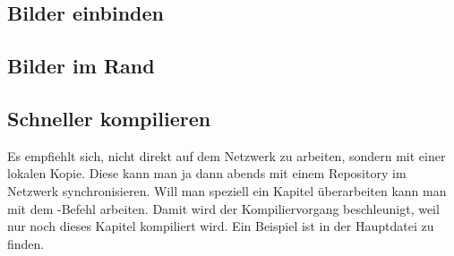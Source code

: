 \subsection{Bilder einbinden}

\subsection{Bilder im Rand}


\subsection{Schneller kompilieren}
Es empfiehlt sich, nicht direkt auf dem Netzwerk zu arbeiten, sondern mit einer lokalen Kopie. Diese kann man ja dann abends mit einem Repository im Netzwerk synchronisieren.
Will man speziell ein Kapitel überarbeiten kann man mit dem \verb++-Befehl arbeiten. Damit wird der Kompiliervorgang beschleunigt, weil nur noch dieses Kapitel kompiliert wird. Ein Beispiel ist in der Hauptdatei zu finden.

